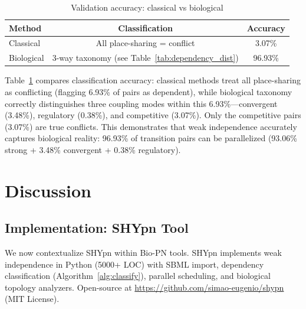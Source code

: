 \documentclass[twocolumn,11pt]{article}
\begin{document}
\begin{table}[H]
\small
\caption{Validation accuracy: classical vs biological}
\label{tab:validation}
\vspace{-6pt}
\begin{tabular*}{\columnwidth}{@{\extracolsep{\fill}}lcc@{}}
\toprule
\textbf{Method} & \textbf{Classification} & \textbf{Accuracy} \\
\midrule
Classical & All place-sharing = conflict & 3.07\% \\
Biological & 3-way taxonomy (see Table~\ref{tab:dependency_dist}) & 96.93\% \\
\bottomrule
\end{tabular*}
\vspace{-8pt}
\end{table}

Table~\ref{tab:validation} compares classification accuracy: classical methods treat all place-sharing as conflicting (flagging 6.93\% of pairs as dependent), while biological taxonomy correctly distinguishes three coupling modes within this 6.93\%---convergent (3.48\%), regulatory (0.38\%), and competitive (3.07\%). Only the competitive pairs (3.07\%) are true conflicts. This demonstrates that weak independence accurately captures biological reality: 96.93\% of transition pairs can be parallelized (93.06\% strong + 3.48\% convergent + 0.38\% regulatory).

\section{Discussion}

\subsection{Implementation: SHYpn Tool}

We now contextualize SHYpn within Bio-PN tools. SHYpn implements weak independence in Python (5000+ LOC) with SBML import, dependency classification (Algorithm~\ref{alg:classify}), parallel scheduling, and biological topology analyzers. Open-source at \url{https://github.com/simao-eugenio/shypn} (MIT License).
\end{document}

